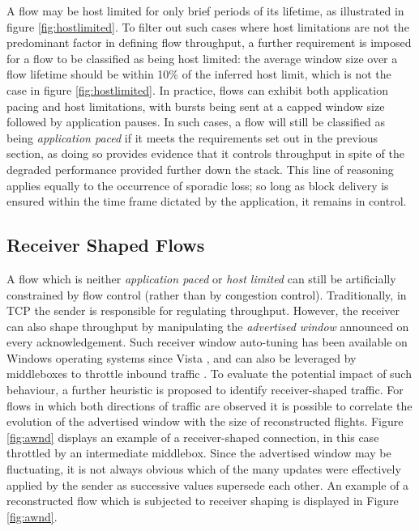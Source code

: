 A flow may be host limited for only brief periods of its lifetime, as illustrated in figure \ref{fig:hostlimited}.
To filter out such cases where host limitations are not the predominant factor in defining flow throughput, a further requirement is imposed for a flow to be classified as being host limited: the average window size over a flow lifetime should be within 10\% of the inferred host limit, which is not the case in figure \ref{fig:hostlimited}.
In practice, flows can exhibit both application pacing and host limitations, with bursts being sent at a capped window size followed by application pauses.
In such cases, a flow will still be classified as being \emph{application paced} if it meets the requirements set out in the previous section, as doing so provides evidence that it controls throughput in spite of the degraded performance provided further down the stack. 
This line of reasoning applies equally to the occurrence of sporadic loss; so long as block delivery is ensured within the time frame dictated by the application, it remains in control.

\subsection{Receiver Shaped Flows}
\label{section:rate:recv}

A flow which is neither \emph{application paced} or \emph{host limited} can still be artificially constrained by flow control (rather than by congestion control).
Traditionally, in \ac{TCP} the sender is responsible for regulating throughput. 
However, the receiver can also shape throughput by manipulating the \emph{advertised window} announced on every acknowledgement.
Such receiver window auto-tuning has been available on Windows operating systems since Vista \cite{vistaReceiveWindow}, and can also be leveraged by middleboxes to throttle inbound traffic \cite{appEx}.
To evaluate the potential impact of such behaviour, a further heuristic is proposed to identify receiver-shaped traffic.
For flows in which both directions of traffic are observed it is possible to correlate the evolution of the advertised window with the size of reconstructed flights.
Figure \ref{fig:awnd} displays an example of a receiver-shaped connection, in this case throttled by an intermediate middlebox.
Since the advertised window may be fluctuating, it is not always obvious which of the many updates were effectively applied by the sender as successive values supersede each other.
An example of a reconstructed flow which is subjected to receiver shaping is displayed in Figure \ref{fig:awnd}.

